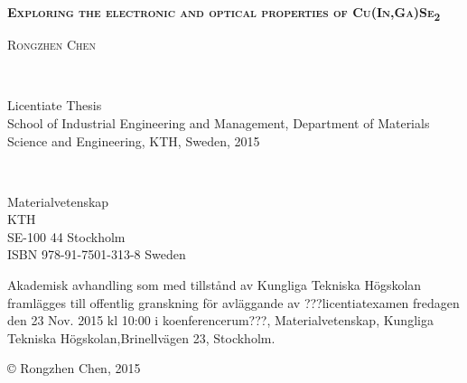 \documentclass[a4paper, 12pt, titlepage,oneside,drop]{kthesis}
\begin{document}
\setcounter{page}{1}

\begin{center}




  \vspace{5 cm}





  \vspace{12pt}
  \textsc{\LARGE{\textbf{Exploring the electronic and optical properties of Cu(In,Ga)Se\textsubscript{2} }}}
  \vspace{12pt}

  \vspace{5 cm}

  \textsc{\large{Rongzhen Chen}}


  \vfill 

  \ 

  \large{Licentiate Thesis}
  \\
  \large{School of Industrial Engineering and Management,
  Department of Materials Science and Engineering,
  KTH, Sweden, 2015}

\end{center}

 \thispagestyle{empty}



\newpage
\setcounter{page}{2}
\thispagestyle{empty}
\
\vfill

\begin{flushright}
 Materialvetenskap\\
 KTH\\
{\color{red} \hfill SE-100 44 Stockholm\\ ISBN 978-91-7501-313-8  \hfill}
Sweden\\
\end{flushright}


\vspace{5mm}

Akademisk avhandling som med tillstånd av Kungliga Tekniska
Högskolan framlägges till offentlig granskning för avläggande av
{\color{red}???licentiatexamen fredagen den 23 Nov. 2015 kl 10:00 i koenferencerum???}, Materialvetenskap, Kungliga Tekniska
Högskolan,\linebreak Brinellvägen 23, Stockholm.

\vspace{5mm}

\copyright \hspace{3pt} {Rongzhen Chen, 2015}
\end{document}
